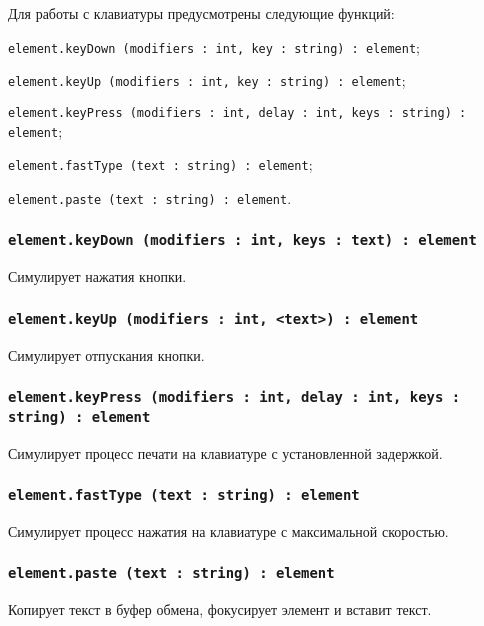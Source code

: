 Для работы с клавиатуры предусмотрены следующие функций:
\begin{icItems}
	\item \lstinline|element.keyDown (modifiers : int, key : string) : element|;
	\item \lstinline|element.keyUp (modifiers : int, key : string) : element|;
	\item \lstinline|element.keyPress (modifiers : int, delay : int, keys : string) : element|;
	\item \lstinline|element.fastType (text : string) : element|;
	\item \lstinline|element.paste (text : string) : element|.
\end{icItems}

\subsubsection{\lstinline|element.keyDown (modifiers : int, keys : text) : element|}

Симулирует нажатия кнопки.

\subsubsection{\lstinline|element.keyUp (modifiers : int, <text>) : element|}

Симулирует отпускания кнопки.

\subsubsection{\lstinline|element.keyPress (modifiers : int, delay : int, keys : string) : element|}

Симулирует процесс печати на клавиатуре с установленной задержкой.

\subsubsection{\lstinline|element.fastType (text : string) : element|}

Симулирует процесс нажатия на клавиатуре с максимальной скоростью.

\subsubsection{\lstinline|element.paste (text : string) : element|}

Копирует текст в буфер обмена, фокусирует элемент и вставит текст.

